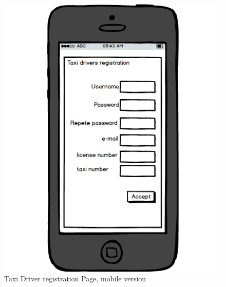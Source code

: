 \documentclass{report}
\begin{document}
			\begin{figure}[H]
			\centering
			\includegraphics[scale=0.4]{IMG/UserInterfaces/TaxiDriverRegistration_m.png}
			\caption{Taxi Driver registration Page, mobile version}\label{visina8}
			\end{figure}
			
\end{document}
